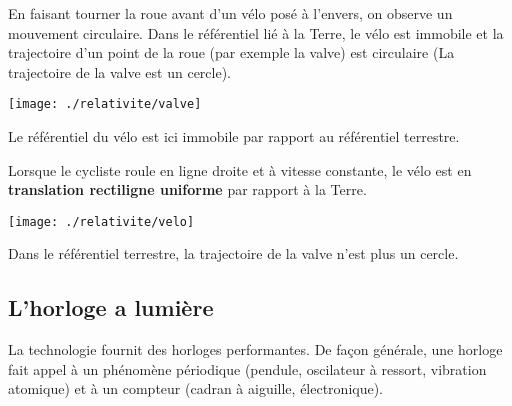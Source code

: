 \begin{minipage}[c]{.45\linewidth}

En faisant tourner la roue avant d'un vélo posé à l'envers, on observe un mouvement circulaire. Dans le référentiel lié à la Terre, le vélo est immobile et la trajectoire d'un point de la roue (par exemple la valve) est circulaire (La trajectoire de la valve est un cercle).

\begin{center}
\texttt{[image: ./relativite/valve]}
\end{center}

Le référentiel du vélo est ici immobile par rapport au référentiel terrestre.

\end{minipage}
\hfill
\begin{minipage}[c]{.45\linewidth}

Lorsque le cycliste roule en ligne droite et à vitesse constante, le vélo est en {\bf translation rectiligne uniforme} par rapport à la Terre.


\begin{center}
\texttt{[image: ./relativite/velo]}
\end{center}

Dans le référentiel terrestre, la trajectoire de la valve n'est plus un cercle.

\end{minipage}


\subsection{L'horloge a lumière}

La technologie fournit des horloges performantes. De façon générale, une horloge fait appel à un phénomène périodique (pendule, oscilateur à ressort, vibration atomique) et à un compteur (cadran à aiguille, électronique).


